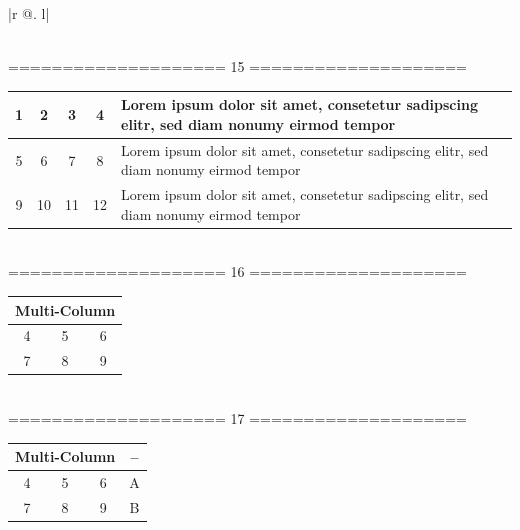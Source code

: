 \documentclass[12pt, a4paper, onecolumn]{article}
\begin{document}
\begin{center}
\begin{tabular}{|r @. l|}
\end{tabular}\\[20pt]



\newpage
====================  15  ====================\\[15pt]

\begin{tabular}{|c | c | c | c | p{5cm}|} %
	
	\hline
	1 & 2 & 3 & 4 & Lorem ipsum dolor sit amet, consetetur sadipscing elitr, sed diam nonumy eirmod tempor\\ 
	\hline
	5 & 6 & 7 & 8 & Lorem ipsum dolor sit amet, consetetur sadipscing elitr, sed diam nonumy eirmod tempor\\ 
	\hline
	9 & 10 & 11 & 12 & Lorem ipsum dolor sit amet, consetetur sadipscing elitr, sed diam nonumy eirmod tempor\\ 
	\hline
	
\end{tabular}\\[20pt]


====================  16  ====================\\[15pt] %
%

\begin{tabular}{|c|c|c|}
	
	\hline
	\multicolumn{3}{|c|}{Multi-Column}\\
	\hline
	4 & 5 & 6\\
	\hline
	7 & 8 & 9\\
	\hline
	
\end{tabular}\\[20pt]


====================  17  ====================\\[15pt]
%

\begin{tabular}{|c|c|c|c|}
	
	\hline
	\multicolumn{3}{|c|}{Multi-Column} & --\\
	\hline
	4 & 5 & 6 & A\\
	\hline
	7 & 8 & 9 & B\\
	\hline
	

\end{tabular}
\end{center}
\end{document}
